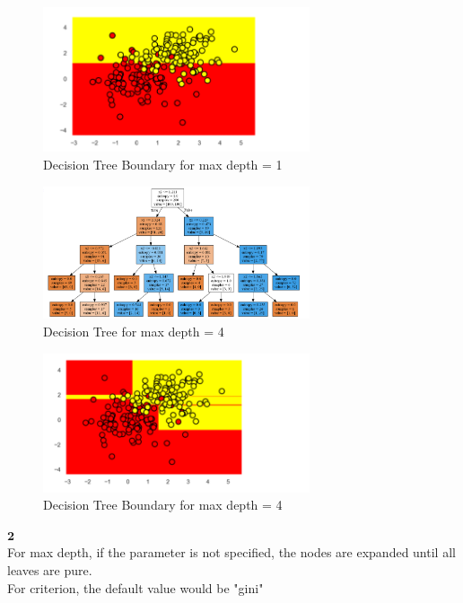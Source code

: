 \documentclass[12pt]{article}
\begin{document}
\begin{figure}[H] 
\centering 
\includegraphics[width=0.7\textwidth]{decisionboundary1} 
\caption{Decision Tree Boundary for max depth = 1}
\end{figure}

\begin{figure}[H] 
\centering 
\includegraphics[width=0.7\textwidth]{decisiontree4} 
\caption{Decision Tree for max depth = 4}
\end{figure}

\begin{figure}[H] 
\centering 
\includegraphics[width=0.7\textwidth]{decisionboundary4} 
\caption{Decision Tree Boundary for max depth = 4}
\end{figure}

$\textbf{2}$\\

For max depth, if the parameter is not specified, the nodes are expanded until all leaves are pure.\\

For criterion, the default value would be "gini"\\
\end{document}
